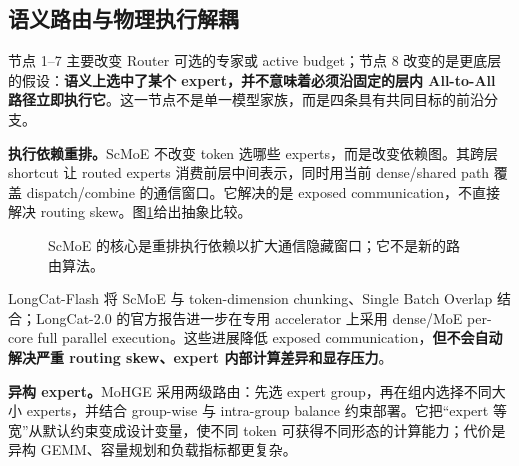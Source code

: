 \documentclass[10pt,a4paper,fontset=none]{ctexart}
\newcommand{\term}[1]{\textbf{#1}}
\begin{document}
\subsection{语义路由与物理执行解耦}

节点 1--7 主要改变 Router 可选的专家或 active budget；节点 8 改变的是更底层的假设：\term{语义上选中了某个 expert，并不意味着必须沿固定的层内 All-to-All 路径立即执行它}。这一节点不是单一模型家族，而是四条具有共同目标的前沿分支。

\textbf{执行依赖重排。}ScMoE 不改变 token 选哪些 experts，而是改变依赖图。其跨层 shortcut 让 routed experts 消费前层中间表示，同时用当前 dense/shared path 覆盖 dispatch/combine 的通信窗口\cite{zh:cai2024scmoe}。它解决的是 exposed communication，不直接解决 routing skew。图\ref{zh:fig:scmoe}给出抽象比较。

\begin{figure}[htbp]
\centering
{}
\caption{ScMoE 的核心是重排执行依赖以扩大通信隐藏窗口；它不是新的路由算法。}
\label{zh:fig:scmoe}
\end{figure}

LongCat-Flash 将 ScMoE 与 token-dimension chunking、Single Batch Overlap 结合；LongCat-2.0 的官方报告进一步在专用 accelerator 上采用 dense/MoE per-core full parallel execution\cite{zh:longcat2}。这些进展降低 exposed communication，\textbf{但不会自动解决严重 routing skew、expert 内部计算差异和显存压力}。

\textbf{异构 expert。}MoHGE 采用两级路由：先选 expert group，再在组内选择不同大小 experts，并结合 group-wise 与 intra-group balance 约束部署\cite{zh:mohge2026}。它把“expert 等宽”从默认约束变成设计变量，使不同 token 可获得不同形态的计算能力；代价是异构 GEMM、容量规划和负载指标都更复杂。
\end{document}
